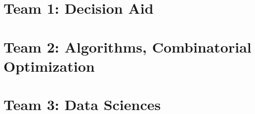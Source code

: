 \documentclass[version=last, pagesize, twoside=semi, DIV=calc, 12pt, a4paper, french, english, bibliography=totoc]{scrartcl}
\renewcommand{\cite}{\citep}
\begin{document}
\newpage
\pagestyle{empty}
\null
\newpage
\pagestyle{plain}



\section{Team 1: Decision Aid}\label{team1}


\section{Team 2: Algorithms, Combinatorial Optimization}\label{team2}


\section{Team 3: Data Sciences}\label{team3}




 

\end{document}
